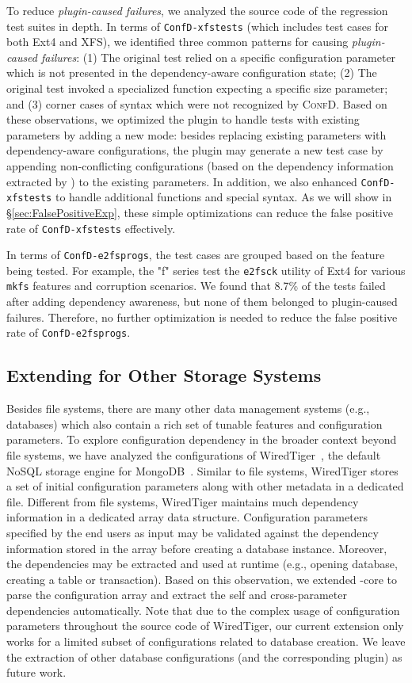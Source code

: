 To reduce \textit{plugin-caused failures}, we analyzed the source code of the regression test suites in depth.
In terms of \texttt{ConfD-xfstests} (which includes test cases for both Ext4 and XFS), we identified three common patterns for causing \textit{plugin-caused failures}:
(1) The original test relied on a specific configuration parameter which is not presented in the dependency-aware configuration state; (2) The original test invoked a specialized function expecting a specific size parameter; and (3) corner cases of  syntax which were not recognized by \textsc{ConfD}. Based on these observations, we optimized the  plugin to handle tests with existing parameters  by adding a new mode: besides replacing existing parameters with dependency-aware configurations, the plugin may generate a new test case by  appending non-conflicting configurations (based on the dependency information extracted by \prj) to the existing parameters. 
In addition, we also enhanced \texttt{ConfD-xfstests}  to handle additional  functions and special syntax. As we will show in \S\ref{sec:FalsePositiveExp}, these simple optimizations can reduce the false positive rate of \texttt{ConfD-xfstests}  effectively.

In terms of \texttt{ConfD-e2fsprogs},  the test cases are grouped based on the feature being tested. For example, the "f" series test the \texttt{e2fsck} utility of Ext4 for various \texttt{mkfs}
features and corruption scenarios. We found that 8.7\% of the tests failed after adding dependency awareness, but none of 
them belonged to {plugin-caused failures}.   
Therefore,  no further optimization is needed to reduce the false positive rate of  \texttt{ConfD-e2fsprogs}.


\subsection{Extending \prj for Other Storage Systems}
\label{sec:DBextension}
Besides file systems, there are many other data management systems (e.g., databases) which also contain a rich set of tunable features and configuration parameters. To explore   configuration dependency in the broader context beyond file systems, we have analyzed the configurations of  WiredTiger~\cite{wt}, the default NoSQL storage engine for MongoDB~\cite{mongodb}. Similar to file systems,  WiredTiger stores a set of initial configuration parameters along with other  metadata  in a dedicated file. 
Different from file systems, WiredTiger maintains much  dependency information in a dedicated array data structure. Configuration parameters specified by the end users  as input may be validated against the dependency information stored in the  array before creating a database instance. Moreover, the dependencies may be extracted and used at runtime (e.g., opening database, creating a table or transaction). 
Based on this  observation, we extended \prj-core  to parse  the configuration array and extract the self and cross-parameter dependencies automatically. Note that due to the complex usage of configuration parameters throughout the source code of WiredTiger, our current extension  only works for a limited subset of configurations related to database creation. We leave the  extraction  of other database configurations  (and the corresponding plugin)  as future work.
